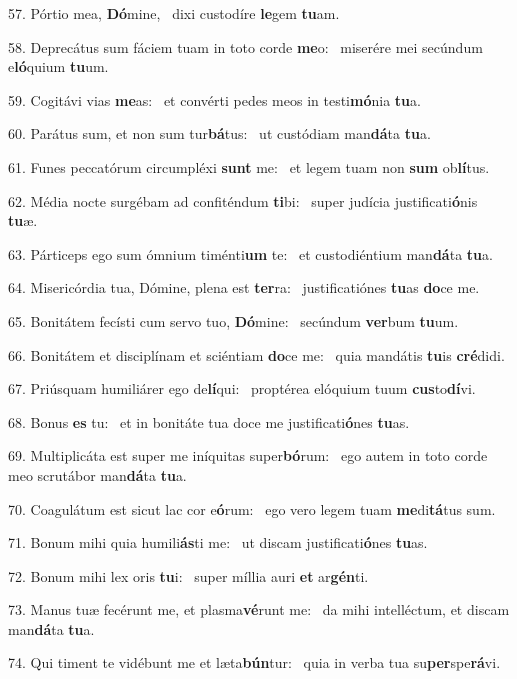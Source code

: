 57. Pórtio mea, \textbf{Dó}mine, \ast\  dixi custodíre \textbf{le}gem \textbf{tu}am.\

58. Deprecátus sum fáciem tuam in toto corde \textbf{me}o: \ast\  miserére mei secúndum e\textbf{ló}quium \textbf{tu}um.\

59. Cogitávi vias \textbf{me}as: \ast\  et convérti pedes meos in testi\textbf{mó}nia \textbf{tu}a.\

60. Parátus sum, et non sum tur\textbf{bá}tus: \ast\  ut custódiam man\textbf{dá}ta \textbf{tu}a.\

61. Funes peccatórum circumpléxi \textbf{sunt} me: \ast\  et legem tuam non \textbf{sum} ob\textbf{lí}tus.\

62. Média nocte surgébam ad confiténdum \textbf{ti}bi: \ast\  super judícia justificati\textbf{ó}nis \textbf{tu}æ.\

63. Párticeps ego sum ómnium timénti\textbf{um} te: \ast\  et custodiéntium man\textbf{dá}ta \textbf{tu}a.\

64. Misericórdia tua, Dómine, plena est \textbf{ter}ra: \ast\  justificatiónes \textbf{tu}as \textbf{do}ce me.\

65. Bonitátem fecísti cum servo tuo, \textbf{Dó}mine: \ast\  secúndum \textbf{ver}bum \textbf{tu}um.\

66. Bonitátem et disciplínam et sciéntiam \textbf{do}ce me: \ast\  quia mandátis \textbf{tu}is \textbf{cré}didi.\

67. Priúsquam humiliárer ego de\textbf{lí}qui: \ast\  proptérea elóquium tuum \textbf{cus}to\textbf{dí}vi.\

68. Bonus \textbf{es} tu: \ast\  et in bonitáte tua doce me justificati\textbf{ó}nes \textbf{tu}as.\

69. Multiplicáta est super me iníquitas super\textbf{bó}rum: \ast\  ego autem in toto corde meo scrutábor man\textbf{dá}ta \textbf{tu}a.\

70. Coagulátum est sicut lac cor e\textbf{ó}rum: \ast\  ego vero legem tuam \textbf{me}di\textbf{tá}tus sum.\

71. Bonum mihi quia humili\textbf{ás}ti me: \ast\  ut discam justificati\textbf{ó}nes \textbf{tu}as.\

72. Bonum mihi lex oris \textbf{tu}i: \ast\  super míllia auri \textbf{et} ar\textbf{gén}ti.\

73. Manus tuæ fecérunt me, et plasma\textbf{vé}runt me: \ast\  da mihi intelléctum, et discam man\textbf{dá}ta \textbf{tu}a.\

74. Qui timent te vidébunt me et læta\textbf{bún}tur: \ast\  quia in verba tua su\textbf{per}spe\textbf{rá}vi.\

